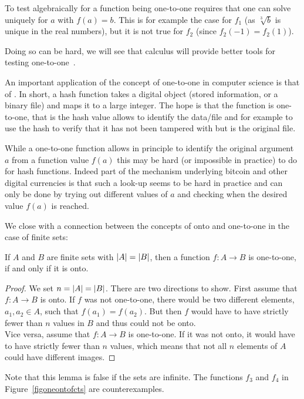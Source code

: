 To test algebraically for a function being one-to-one requires that one can solve
uniquely for $a$ with $f(a)=b$. This is for example the case for $f_1$ (as
$\sqrt[3]{b}$ is unique in the real numbers), but it is not true for $f_2$ (since
$f_2(-1)=f_2(1)$).

Doing so can be hard, we will see that calculus will provide better tools
for testing one-to-one~.

An important application of the concept of one-to-one in computer science is
that of . In short, a hash function takes a digital
object (stored information, or a binary file) and maps it to a large
integer. The hope is that the function is one-to-one, that is the hash value allows to
identify the data/file and for example to use the hash to verify that it has
not been tampered with but is the original file.

While a one-to-one function allows in principle to identify the original
argument $a$ from a function value $f(a)$ this may be hard (or impossible in
practice) to do for hash functions. Indeed part of the mechanism underlying
bitcoin and other digital currencies is that such a look-up seems to be hard
in practice and can only be done by trying out different values of $a$ and
checking when the desired value $f(a)$ is reached.
\medskip

We close with a connection between the concepts of onto and one-to-one in
the case of finite sets:
\begin{lemma}
\label{lemoneonto}
If $A$ and $B$ are finite sets with $\left|A\right|=\left|B\right|$, then a function $f\colon A\to B$ is
one-to-one, if and only if it is onto.
\end{lemma}
\begin{proof}
We set $n=\left|A\right|=\left|B\right|$.
There are two directions to show. First assume that $f\colon A\to B$ is onto. If $f$ was
not one-to-one, there would be two different elements, $a_1,a_2\in A$, such that
$f(a_1)=f(a_2)$. But then $f$ would have to have strictly fewer than $n$ values in $B$
and thus could not be onto.\\
Vice versa, assume that $f\colon A\to B$ is one-to-one. If it was not onto, it would
have to have strictly fewer than $n$ values, which means that not all $n$ elements of
$A$ could have different images.
\end{proof}
Note that this lemma is false if the sets are infinite. The functions $f_3$ and $f_4$ in
Figure~\ref{figoneontofcts} are counterexamples.

